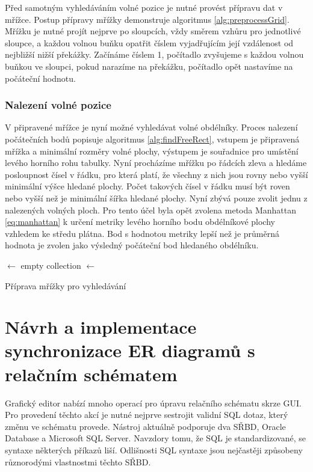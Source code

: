 \documentclass[czech,bachelor,public,dept460,male,oneside]{diploma}
\begin{document}
	Před samotným vyhledáváním volné pozice je nutné provést přípravu dat v mřížce. Postup přípravy mřížky demonstruje algoritmus \ref{alg:preprocessGrid}. Mřížku je nutné projít nejprve po sloupcích, vždy směrem vzhůru pro jednotlivé sloupce, a každou volnou buňku opatřit číslem vyjadřujícím její vzdálenost od nejbližší nižší překážky. Začínáme číslem 1, počítadlo zvyšujeme s každou volnou buňkou ve sloupci, pokud narazíme na překážku, počítadlo opět nastavíme na počáteční hodnotu. 
	
	\subsubsection{Nalezení volné pozice}
	V připravené mřížce je nyní možné vyhledávat volné obdélníky. Proces nalezení počátečních bodů popisuje algoritmus \ref{alg:findFreeRect}, vstupem je připravená mřížka a minimální rozměry volné plochy, výstupem je souřadnice pro umístění levého horního rohu tabulky. Nyní procházíme mřížku po řádcích zleva a hledáme posloupnost čísel v řádku, pro která platí, že všechny z nich jsou rovny nebo vyšší minimální výšce hledané plochy. Počet takových čísel v řádku musí být roven nebo vyšší než je minimální šířka hledané plochy. Nyní zbývá pouze zvolit jednu z nalezených volných ploch. Pro tento účel byla opět zvolena metoda Manhattan \ref{eq:manhattan} k určení metriky levého horního bodu obdélníkové plochy vzhledem ke středu plátna. Bod s hodnotou metriky lepší než je průměrná hodnota je zvolen jako výsledný počáteční bod hledaného obdélníku. 
	
		\begin{algorithm}[!h]
		
		
		\BlankLine
		
		\Nodes $\leftarrow$ empty collection\;
		\Result $\leftarrow$ \Nodes\;
		\caption{Příprava mřížky pro vyhledávání}
		\label{alg:findFreeRect}
	\end{algorithm}
		
\newpage
\section{Návrh a implementace synchronizace ER diagramů s relačním schématem}
Grafický editor nabízí mnoho operací pro úpravu relačního schématu skrze GUI. Pro provedení těchto akcí je nutné nejprve sestrojit validní SQL dotaz, který změnu ve schématu provede. Nástroj aktuálně podporuje dva SŘBD, Oracle Database a Microsoft SQL Server. Navzdory tomu, že SQL je standardizované, se syntaxe některých příkazů liší. Odlišnosti SQL syntaxe jsou nejčastěji způsobeny různorodými vlastnostmi těchto SŘBD. 
\end{document}
